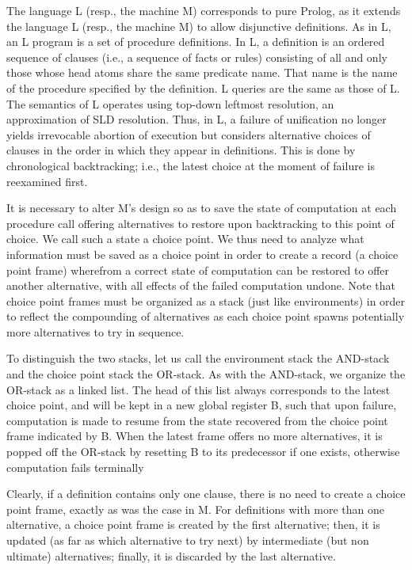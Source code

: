 \label{warren4}\secdown

The language L (resp., the machine M) corresponds to pure Prolog, as it extends
the language L (resp., the machine M) to allow disjunctive definitions.
As in L, an L program is a set of procedure definitions. In L, a definition is
an ordered sequence of clauses (i.e., a sequence of facts or rules) consisting of
all and only those whose head atoms share the same predicate name. That name
is the name of the procedure specified by the definition. L queries are the same
as those of L. The semantics of L operates using top-down leftmost resolution,
an approximation of SLD resolution. Thus, in L, a failure of unification no
longer yields irrevocable abortion of execution but considers alternative choices
of clauses in the order in which they appear in definitions. This is done by chronological
backtracking; i.e., the latest choice at the moment of failure is reexamined
first.

It is necessary to alter M’s design so as to save the state of computation at each
procedure call offering alternatives to restore upon backtracking to this point of
choice. We call such a state a choice point. We thus need to analyze what information
must be saved as a choice point in order to create a record (a choice
point frame) wherefrom a correct state of computation can be restored to offer
another alternative, with all effects of the failed computation undone. Note that
choice point frames must be organized as a stack (just like environments) in order
to reflect the compounding of alternatives as each choice point spawns potentially
more alternatives to try in sequence.

To distinguish the two stacks, let us call the environment stack the AND-stack and
the choice point stack the OR-stack. As with the AND-stack, we organize the
OR-stack as a linked list. The head of this list always corresponds to the latest
choice point, and will be kept in a new global register B, such that upon failure,
computation is made to resume from the state recovered from the choice point
frame indicated by B. When the latest frame offers no more alternatives, it is
popped off the OR-stack by resetting B to its predecessor if one exists, otherwise
computation fails terminally

Clearly, if a definition contains only one clause, there is no need to create a choice
point frame, exactly as was the case in M. For definitions with more than one
alternative, a choice point frame is created by the first alternative; then, it is updated
(as far as which alternative to try next) by intermediate (but non ultimate)
alternatives; finally, it is discarded by the last alternative.




\secup
